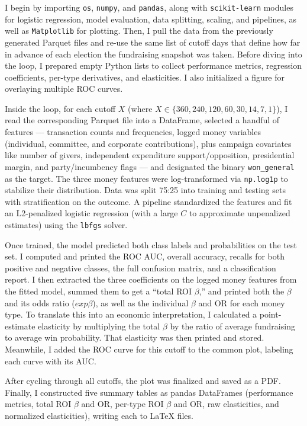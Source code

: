 I begin by importing {\tt os}, {\tt numpy}, and {\tt pandas}, along with {\tt scikit-learn} modules for logistic regression, model evaluation, data splitting, scaling, and pipelines, as well as {\tt Matplotlib} for plotting. Then, I pull the data from the previously generated Parquet files and re-use the same list of cutoff days that define how far in advance of each election the fundraising snapshot was taken. Before diving into the loop, I prepared empty Python lists to collect performance metrics, regression coefficients, per-type derivatives, and elasticities. I also initialized a figure for overlaying multiple ROC curves.

Inside the loop, for each cutoff $X$ (where $X \in \{360, 240, 120, 60, 30, 14, 7, 1 \}$), I read the corresponding Parquet file into a DataFrame, selected a handful of features --- transaction counts and frequencies, logged money variables (individual, committee, and corporate contributions), plus campaign covariates like number of givers, independent expenditure support/opposition, presidential margin, and party/incumbency flags --- and designated the binary {\tt won\_general} as the target. The three money features were log-transformed via {\tt np.log1p} to stabilize their distribution. Data was split 75:25 into training and testing sets with stratification on the outcome. A pipeline standardized the features and fit an L2-penalized logistic regression (with a large $C$ to approximate unpenalized estimates) using the {\tt lbfgs} solver.

Once trained, the model predicted both class labels and probabilities on the test set. I computed and printed the ROC AUC, overall accuracy, recalls for both positive and negative classes, the full confusion matrix, and a classification report. I then extracted the three coefficients on the logged money features from the fitted model, summed them to get a ``total ROI $\beta$,'' and printed both the $\beta$ and its odds ratio ($exp \beta$), as well as the individual $\beta$ and OR for each money type. To translate this into an economic interpretation, I calculated a point-estimate elasticity by multiplying the total $\beta$ by the ratio of average fundraising to average win probability. That elasticity was then printed and stored. Meanwhile, I added the ROC curve for this cutoff to the common plot, labeling each curve with its AUC.

After cycling through all cutoffs, the plot was finalized and saved as a PDF. Finally, I constructed five summary tables as pandas DataFrames (performance metrics, total ROI $\beta$ and OR, per-type ROI $\beta$ and OR, raw elasticities, and normalized elasticities), writing each to LaTeX files.

